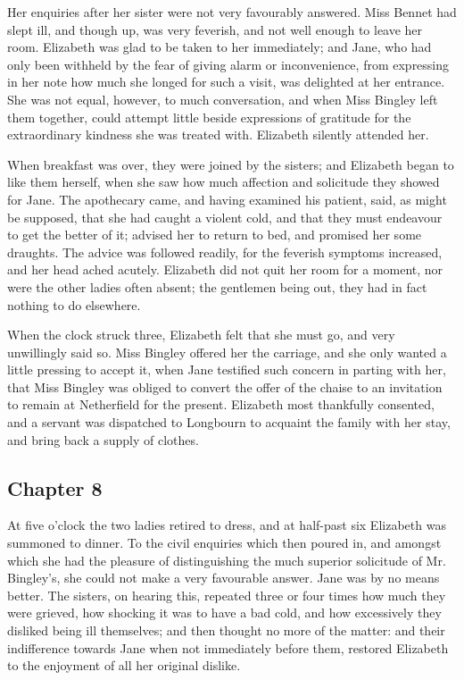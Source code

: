 Her enquiries after her sister were not very favourably answered. Miss Bennet had slept ill, and though up, was very feverish, and not well enough to leave her room. Elizabeth was glad to be taken to her immediately; and Jane, who had only been withheld by the fear of giving alarm or inconvenience, from expressing in her note how much she longed for such a visit, was delighted at her entrance. She was not equal, however, to much conversation, and when Miss Bingley left them together, could attempt little beside expressions of gratitude for the extraordinary kindness she was treated with. Elizabeth silently attended her.

When breakfast was over, they were joined by the sisters; and Elizabeth began to like them herself, when she saw how much affection and solicitude they showed for Jane. The apothecary came, and having examined his patient, said, as might be supposed, that she had caught a violent cold, and that they must endeavour to get the better of it; advised her to return to bed, and promised her some draughts. The advice was followed readily, for the feverish symptoms increased, and her head ached acutely. Elizabeth did not quit her room for a moment, nor were the other ladies often absent; the gentlemen being out, they had in fact nothing to do elsewhere.

When the clock struck three, Elizabeth felt that she must go, and very unwillingly said so. Miss Bingley offered her the carriage, and she only wanted a little pressing to accept it, when Jane testified such concern in parting with her, that Miss Bingley was obliged to convert the offer of the chaise to an invitation to remain at Netherfield for the present. Elizabeth most thankfully consented, and a servant was dispatched to Longbourn to acquaint the family with her stay, and bring back a supply of clothes.

\subsection[chapter-8]{\useURL[url8][][][]\from[url8] Chapter 8}

At five o'clock the two ladies retired to dress, and at half-past six Elizabeth was summoned to dinner. To the civil enquiries which then poured in, and amongst which she had the pleasure of distinguishing the much superior solicitude of Mr. Bingley's, she could not make a very favourable answer. Jane was by no means better. The sisters, on hearing this, repeated three or four times how much they were grieved, how shocking it was to have a bad cold, and how excessively they disliked being ill themselves; and then thought no more of the matter: and their indifference towards Jane when not immediately before them, restored Elizabeth to the enjoyment of all her original dislike.

